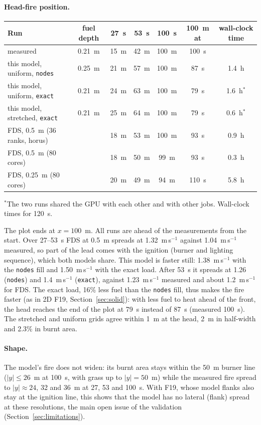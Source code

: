 \documentclass[11pt,a4paper]{article}
\newcommand{\code}[1]{\texttt{#1}}
\begin{document}
\paragraph{Head-fire position.}
\begin{center}
\small
\begin{tabular}{lcccccc}
\toprule
Run & fuel depth & 27~s & 53~s & 100~s & 100~m at & wall-clock time \\
\midrule
measured & 0.21~m & 15~m & 42~m & 100~m & 100~s & \\
this model, uniform, \code{nodes} & 0.25~m & 21~m & 57~m & 100~m & 87~s & 1.4~h \\
this model, uniform, \code{exact} & 0.21~m & 24~m & 63~m & 100~m & 79~s & 1.6~h$^*$ \\
this model, stretched, \code{exact} & 0.21~m & 25~m & 64~m & 100~m & 79~s & 0.6~h$^*$ \\
FDS, 0.5~m (36 ranks, horus) & & 18~m & 53~m & 100~m & 93~s & 0.9~h \\
FDS, 0.5~m (80 cores) & & 18~m & 50~m & 99~m & 93~s & 0.3~h \\
FDS, 0.25~m (80 cores) & & 20~m & 49~m & 94~m & 110~s & 5.8~h \\
\bottomrule
\end{tabular}

\smallskip
{\footnotesize $^*$The two runs shared the GPU with each other and with other jobs. Wall-clock times for 120~s.}
\end{center}
The plot ends at $x=100$~m. All runs are ahead of the measurements from the start. Over 27--53~s FDS at 0.5~m
spreads at 1.32~m\,s$^{-1}$ against 1.04~m\,s$^{-1}$ measured, so part of the lead comes with the ignition
(burner and lighting sequence), which both models share. This model is faster still: 1.38~m\,s$^{-1}$ with the
\code{nodes} fill and 1.50~m\,s$^{-1}$ with the exact load. After 53~s it spreads at 1.26 (\code{nodes}) and
1.4~m\,s$^{-1}$ (\code{exact}), against 1.23~m\,s$^{-1}$ measured and about 1.2~m\,s$^{-1}$ for FDS. The exact load,
16\% less fuel than the \code{nodes} fill, thus makes the fire faster (as in 2D F19,
Section~\ref{sec:solid}): with less fuel to heat ahead of the front, the head reaches the end of the plot
at 79~s instead of 87~s (measured 100~s). The stretched and uniform grids agree within 1~m at the head,
2~m in half-width and 2.3\% in burnt area.

\paragraph{Shape.} The model's fire does not widen: its burnt area stays within the 50~m burner line
($|y|\le26$~m at 100~s, with grass up to $|y|=50$~m) while the measured fire spread to $|y|\approx24$, 32 and
36~m at 27, 53 and 100~s. With F19, whose model flanks also stay at the ignition line, this shows that the
model has no lateral (flank) spread at these resolutions, the main open issue of the validation
(Section~\ref{sec:limitations}).
\end{document}
